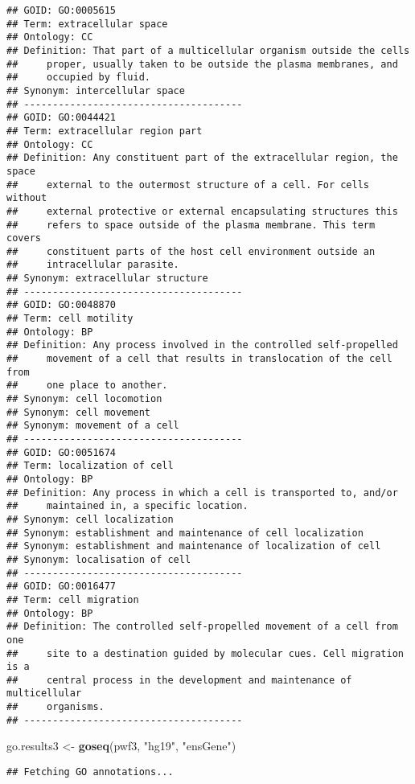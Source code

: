 \documentclass[
]{article}
\newenvironment{Shaded}{\begin{snugshade}}{\end{snugshade}}
\newcommand{\KeywordTok}[1]{\textcolor[rgb]{0.13,0.29,0.53}{\textbf{#1}}}
\newcommand{\NormalTok}[1]{#1}
\newcommand{\StringTok}[1]{\textcolor[rgb]{0.31,0.60,0.02}{#1}}
\begin{document}
\begin{verbatim}
## GOID: GO:0005615
## Term: extracellular space
## Ontology: CC
## Definition: That part of a multicellular organism outside the cells
##     proper, usually taken to be outside the plasma membranes, and
##     occupied by fluid.
## Synonym: intercellular space
## --------------------------------------
## GOID: GO:0044421
## Term: extracellular region part
## Ontology: CC
## Definition: Any constituent part of the extracellular region, the space
##     external to the outermost structure of a cell. For cells without
##     external protective or external encapsulating structures this
##     refers to space outside of the plasma membrane. This term covers
##     constituent parts of the host cell environment outside an
##     intracellular parasite.
## Synonym: extracellular structure
## --------------------------------------
## GOID: GO:0048870
## Term: cell motility
## Ontology: BP
## Definition: Any process involved in the controlled self-propelled
##     movement of a cell that results in translocation of the cell from
##     one place to another.
## Synonym: cell locomotion
## Synonym: cell movement
## Synonym: movement of a cell
## --------------------------------------
## GOID: GO:0051674
## Term: localization of cell
## Ontology: BP
## Definition: Any process in which a cell is transported to, and/or
##     maintained in, a specific location.
## Synonym: cell localization
## Synonym: establishment and maintenance of cell localization
## Synonym: establishment and maintenance of localization of cell
## Synonym: localisation of cell
## --------------------------------------
## GOID: GO:0016477
## Term: cell migration
## Ontology: BP
## Definition: The controlled self-propelled movement of a cell from one
##     site to a destination guided by molecular cues. Cell migration is a
##     central process in the development and maintenance of multicellular
##     organisms.
## --------------------------------------
\end{verbatim}

\begin{Shaded}
\begin{Highlighting}[]
\NormalTok{go.results3 <-}\StringTok{ }\KeywordTok{goseq}\NormalTok{(pwf3, }\StringTok{"hg19"}\NormalTok{, }\StringTok{"ensGene"}\NormalTok{)}
\end{Highlighting}
\end{Shaded}

\begin{verbatim}
## Fetching GO annotations...
\end{verbatim}
\end{document}
